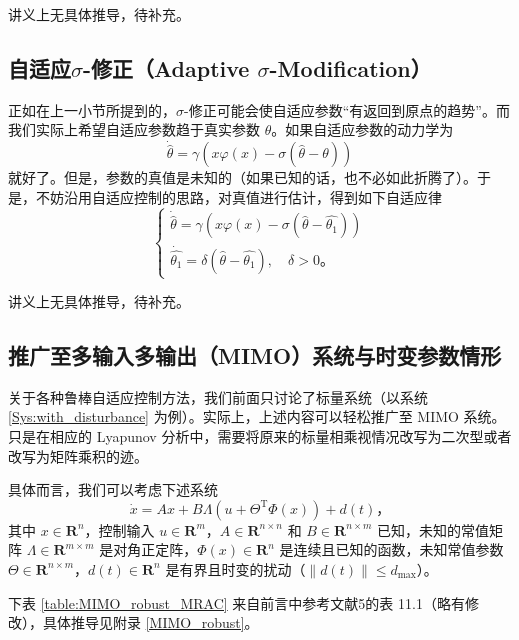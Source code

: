 讲义上无具体推导，待补充。

\subsection{\texorpdfstring{自适应$\sigma$-修正（Adaptive $\sigma$-Modification）}{自适应σ-修正（Adaptive σ-Modification）}}

正如在上一小节所提到的，$\sigma$-修正可能会使自适应参数“有返回到原点的趋势”。而我们实际上希望自适应参数趋于真实参数 $\theta$。如果自适应参数的动力学为
\[
    \dot{\hat{\theta}} = \gamma \left( x\varphi(x) - \sigma \left(\hat{\theta} - \theta \right) \right)
\]
就好了。但是，参数的真值是未知的（如果已知的话，也不必如此折腾了）。于是，不妨沿用自适应控制的思路，对真值进行估计，得到如下自适应律
\[
\begin{cases}
    \dot{\hat{\theta}} = \gamma \left( x\varphi(x) - \sigma \left(\hat{\theta} - \hat{\theta_1} \right) \right) \\
    \dot{\hat{\theta_1}} = \delta \left( \hat{\theta} - \hat{\theta_1} \right), \quad \delta > 0 \text{。}
\end{cases}
\]

讲义上无具体推导，待补充。

\subsection{推广至多输入多输出（MIMO）系统与时变参数情形}

关于各种鲁棒自适应控制方法，我们前面只讨论了标量系统（以系统 \eqref{Sys:with_disturbance} 为例）。实际上，上述内容可以轻松推广至 MIMO 系统。只是在相应的 Lyapunov 分析中，需要将原来的标量相乘视情况改写为二次型或者改写为矩阵乘积的迹。

具体而言，我们可以考虑下述系统
\begin{equation}
    \dot{x} = A x + B \Lambda \left( u + \Theta^\mathrm{T} \Phi(x) \right) + d(t) \text{，}
\end{equation}
其中 $x \in \mathbf{R}^n$，控制输入 $u \in \mathbf{R}^m$，$A \in \mathbf{R}^{n \times n}$ 和 $B \in \mathbf{R}^{n \times m}$ 已知，未知的常值矩阵 $\Lambda \in \mathbf{R}^{m \times m}$ 是对角正定阵，$\Phi(x) \in \mathbf{R}^n$ 是连续且已知的函数，未知常值参数 $\Theta \in \mathbf{R}^{n \times m}$，$d(t) \in \mathbf{R}^n$ 是有界且时变的扰动（$\| d(t) \| \leq d_{\mathrm{max}}$）。

下表 \ref{table:MIMO_robust_MRAC} 来自前言中参考文献5的表 11.1（略有修改），具体推导见附录 \ref{MIMO_robust}。

